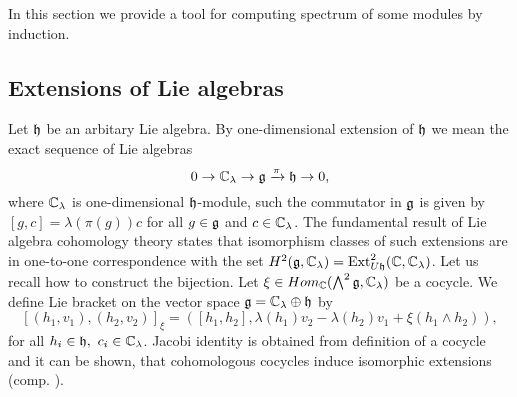 In this section we provide a tool for computing spectrum of some modules by induction.

\subsection{Extensions of Lie algebras}
Let $\mathfrak{h}$ be an arbitary Lie algebra. By one-dimensional extension of $\mathfrak{h}$ we mean the exact
sequence of Lie algebras
\[
    0 \to \mathbb{C}_\lambda\rightarrow \mathfrak{g} \xrightarrow\pi \mathfrak{h} \to 0,
\]
where $\mathbb{C}_\lambda$ is one-dimensional $\mathfrak{h}$-module, such the commutator in $\mathfrak{g}$ is given by
$[g,c] = \lambda(\pi(g))c$ for all $g \in \mathfrak{g}$ and $c \in \mathbb{C}_\lambda$.  The fundamental result of
Lie algebra cohomology theory states that isomorphism classes of such extensions are in one-to-one
correspondence with the set $H^2(\mathfrak{g},\mathbb{C}_\lambda) = \operatorname{Ext}^2_{U\mathfrak{h}}(\mathbb{C}, \mathbb{C}_\lambda)$. Let
us recall how to construct the bijection. Let $\xi \in Hom_{\mathbb{C}}(\bigwedge^2\mathfrak{g}, \mathbb{C}_\lambda)$ be a
cocycle. We define Lie bracket on the vector space $\mathfrak{g} = \mathbb{C}_\lambda \oplus \mathfrak{h}$ by 
\[
    [(h_1, v_1), (h_2, v_2)]_\xi= ([h_1, h_2], \lambda(h_1) v_2 - \lambda(h_2) v_1 +
    \xi(h_1\wedge h_2)), 
\]
for all $h_i \in \mathfrak{h},~c_i\in \mathbb{C}_\lambda$. Jacobi identity is obtained from definition of a
cocycle and it can be shown, that cohomologous cocycles induce isomorphic extensions (comp.
\cite{weibel}).

